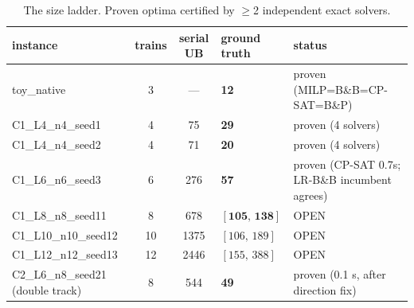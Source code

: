 \documentclass[11pt]{article}
\begin{document}
\begin{table}[h]\centering\small
\caption{The size ladder. Proven optima certified by $\geq$2 independent exact solvers.}
\begin{tabular}{lccll}
\toprule
instance & trains & serial UB & ground truth & status \\
\midrule
toy\_native & 3 & --- & \textbf{12} & proven (MILP=B\&B=CP-SAT=B\&P) \\
C1\_L4\_n4\_seed1 & 4 & 75 & \textbf{29} & proven (4 solvers) \\
C1\_L4\_n4\_seed2 & 4 & 71 & \textbf{20} & proven (4 solvers) \\
C1\_L6\_n6\_seed3 & 6 & 276 & \textbf{57} & proven (CP-SAT 0.7s; LR-B\&B incumbent agrees) \\
C1\_L8\_n8\_seed11 & 8 & 678 & $[\mathbf{105},\,\mathbf{138}]$ & OPEN \\
C1\_L10\_n10\_seed12 & 10 & 1375 & $[106,\,189]$ & OPEN \\
C1\_L12\_n12\_seed13 & 12 & 2446 & $[155,\,388]$ & OPEN \\
C2\_L6\_n8\_seed21 (double track) & 8 & 544 & \textbf{49} & proven (0.1 s, after direction fix) \\
\bottomrule
\end{tabular}
\end{table}
\end{document}
